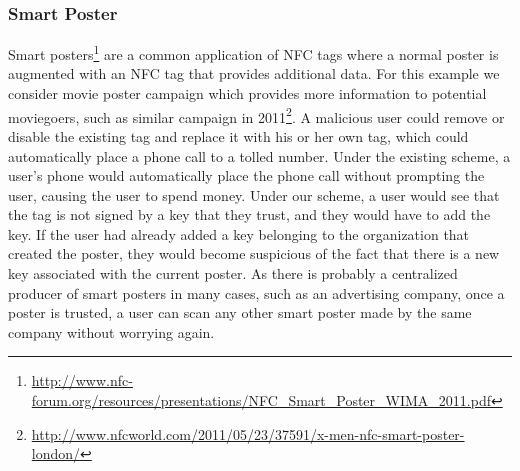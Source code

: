 \documentclass[12pt]{article}
\begin{document}
\subsubsection{Smart Poster}
Smart posters\footnote{\url{http://www.nfc-forum.org/resources/presentations/NFC_Smart_Poster_WIMA_2011.pdf}} are a common application of NFC tags where a normal poster is augmented with an NFC tag that provides additional data.
For this example we consider movie poster campaign which provides more information to potential moviegoers, such as similar campaign in 2011\footnote{\url{http://www.nfcworld.com/2011/05/23/37591/x-men-nfc-smart-poster-london/}}.
A malicious user could remove or disable the existing tag and replace it with his or her own tag, which could automatically place a phone call to a tolled number.
Under the existing scheme, a user's phone would automatically place the phone call without prompting the user, causing the user to spend money.
Under our scheme, a user would see that the tag is not signed by a key that they trust, and they would have to add the key.
If the user had already added a key belonging to the organization that created the poster, they would become suspicious of the fact that there is a new key associated with the current poster.
As there is probably a centralized producer of smart posters in many cases, such as an advertising company, once a poster is trusted, a user can scan any other smart poster made by the same company without worrying again. 
\end{document}
